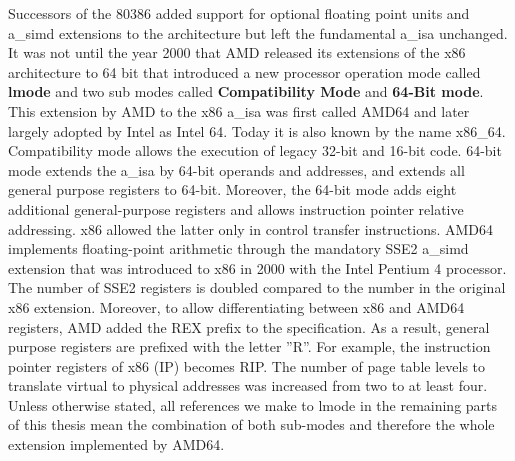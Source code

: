 Successors of the 80386 added support for optional floating point units and
\acrshort{a_simd} extensions to the architecture but left the fundamental
\acrshort{a_isa} unchanged. It was not until the year 2000 that AMD released
its extensions of the x86 architecture to 64 bit that introduced a new processor
operation mode called \textbf{\gls{lmode}} and two sub modes called
\textbf{Compatibility Mode} and \textbf{64-Bit mode}. This extension by AMD to
the x86 \acrshort{a_isa} was first called AMD64 and later largely adopted by
Intel as Intel 64. Today it is also known by the name x86\_64.
Compatibility mode allows the execution of legacy 32-bit and 16-bit code.
64-bit mode extends the \acrshort{a_isa} by 64-bit operands and addresses, and
extends all general purpose registers to 64-bit. Moreover, the 64-bit mode
adds eight additional general-purpose registers and allows instruction pointer
relative addressing. x86 allowed the latter only in control transfer
instructions. AMD64 implements floating-point arithmetic through the mandatory
SSE2 \acrshort{a_simd} extension that was introduced to x86 in 2000 with the Intel
Pentium 4 processor. The number of SSE2 registers is doubled compared to the
number in the original x86 extension. Moreover, to allow differentiating between
x86 and AMD64 registers, AMD added the REX prefix to the specification. As a
result, general purpose registers are prefixed with the letter ''R''. For
example, the instruction pointer registers of x86 (IP) becomes RIP. The number
of page table levels to translate virtual to physical addresses was increased
from two to at least four.\\

Unless otherwise stated, all references we make to \gls{lmode} in
the remaining parts of this thesis mean the combination of both sub-modes and
therefore the whole extension implemented by AMD64.

